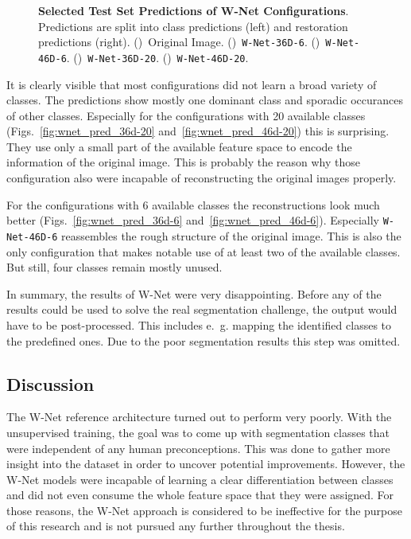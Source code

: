\begin{figure}[h]
    \caption[Selected Test Set Predictions of W-Net Configurations]
    {\textbf{Selected Test Set Predictions of W-Net Configurations}. Predictions are split into class predictions (left) and restoration predictions (right).
    ()~Original Image.
    ()~\texttt{W-Net-36D-6}.
    ()~\texttt{W-Net-46D-6}.
    ()~\texttt{W-Net-36D-20}.
    ()~\texttt{W-Net-46D-20}.}
    \label{fig:wnet_prediction_images}
\end{figure}

It is clearly visible that most configurations did not learn a broad variety of classes. The predictions show mostly one dominant class and sporadic occurances of other classes. Especially for the configurations with 20 available classes (Figs.~\ref{fig:wnet_pred_36d-20} and~\ref{fig:wnet_pred_46d-20}) this is surprising. They use only a small part of the available feature space to encode the information of the original image. This is probably the reason why those configuration also were incapable of reconstructing the original images properly.

For the configurations with 6 available classes the reconstructions look much better (Figs.~\ref{fig:wnet_pred_36d-6} and~\ref{fig:wnet_pred_46d-6}). Especially \texttt{W-Net-46D-6} reassembles the rough structure of the original image. This is also the only configuration that makes notable use of at least two of the available classes. But still, four classes remain mostly unused.

In summary, the results of W-Net were very disappointing. Before any of the results could be used to solve the real segmentation challenge, the output would have to be post-processed. This includes e.~g. mapping the identified classes to the predefined ones. Due to the poor segmentation results this step was omitted.

\subsection{Discussion}
\label{sec:segmentation_discussion}
The W-Net reference architecture turned out to perform very poorly. With the unsupervised training, the goal was to come up with segmentation classes that were independent of any human preconceptions. This was done to gather more insight into the dataset in order to uncover potential improvements. However, the W-Net models were incapable of learning a clear differentiation between classes and did not even consume the whole feature space that they were assigned. For those reasons, the W-Net approach is considered to be ineffective for the purpose of this research and is not pursued any further throughout the thesis.

